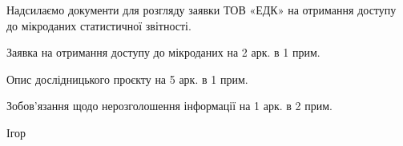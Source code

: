 \documentclass[14pt]{dstu4163}
\begin{document}

Надсилаємо документи для розгляду заявки ТОВ «ЕДК» на отримання доступу
до мікроданих статистичної звітності.

\begin{attachments}
  \item Заявка на отримання доступу до мікроданих на 2 арк. в 1 прим.
  \item Опис дослідницького проєкту на 5 арк. в 1 прим.
  \item Зобов'язання щодо нерозголошення інформації на 1 арк. в 2 прим.
\end{attachments}

\signature{Директор}{Ігор }

\end{document}
